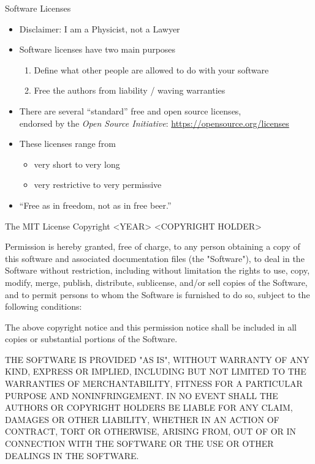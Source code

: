 \documentclass[
  aspectratio=1610,
]{beamer}
\begin{document}
\begin{frame}[c]{Software Licenses}
  \begin{itemize}
    \item Disclaimer: I am a Physicist, not a Lawyer
    \item Software licenses have two main purposes
      \begin{enumerate}
        \item Define what other people are allowed to do with your software
        \item Free the authors from liability / waving warranties
      \end{enumerate}
    \item There are several \enquote{standard} free and open source licenses,\\
      endorsed by the \emph{Open Source Initiative}: \url{https://opensource.org/licenses}
    \item These licenses range from
      \begin{itemize}
        \item very short to very long
        \item very restrictive to very permissive
      \end{itemize}
    \item \enquote{Free as in freedom, not as in free beer.}
  \end{itemize}
\end{frame}

\begin{frame}[c]{The MIT License}
  \small
  Copyright <YEAR> <COPYRIGHT HOLDER>

  Permission is hereby granted, free of charge, to any person obtaining a copy of this software and associated documentation files
  (the "Software"), to deal in the Software without restriction, including without limitation the rights to use, copy, modify, merge, publish, distribute, sublicense, and/or sell copies of the Software, and to permit persons to whom the Software is furnished to do so, subject to the following conditions:

  The above copyright notice and this permission notice shall be included in all copies or substantial portions of the Software.

  THE SOFTWARE IS PROVIDED "AS IS", WITHOUT WARRANTY OF ANY KIND, EXPRESS OR IMPLIED, INCLUDING BUT NOT LIMITED TO THE WARRANTIES OF MERCHANTABILITY, FITNESS FOR A PARTICULAR PURPOSE AND NONINFRINGEMENT. IN NO EVENT SHALL THE AUTHORS OR COPYRIGHT HOLDERS BE LIABLE FOR ANY CLAIM, DAMAGES OR OTHER LIABILITY, WHETHER IN AN ACTION OF CONTRACT, TORT OR OTHERWISE, ARISING FROM, OUT OF OR IN CONNECTION WITH THE SOFTWARE OR THE USE OR OTHER DEALINGS IN THE SOFTWARE.
\end{frame}
\end{document}

